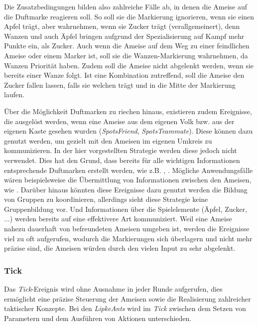 Die Zusatzbedingungen bilden also zahlreiche Fälle ab, in denen die Ameise auf die Duftmarke reagieren soll. So soll sie die Markierung ignorieren, wenn sie einen Apfel trägt, aber wahrnehmen, wenn sie Zucker trägt (verallgemeinert), denn Wanzen und auch Äpfel bringen aufgrund der Spezialisierung auf Kampf mehr Punkte ein, als Zucker. Auch wenn die Ameise auf dem Weg zu einer feindlichen Ameise oder einem Marker ist, soll sie die Wanzen-Markierung wahrnehmen, da Wanzen Priorität haben. Zudem soll die Ameise nicht abgelenkt werden, wenn sie bereits einer Wanze folgt. Ist eine Kombination zutreffend, soll die Ameise den Zucker fallen lassen, falls sie welchen trägt und in die Mitte der Markierung laufen.

Über die Möglichkeit Duftmarken zu riechen hinaus, existieren zudem Ereignisse, die ausgelöst werden, wenn eine Ameise aus dem eigenen Volk bzw. aus der eigenen Kaste gesehen wurden (\textit{SpotsFriend}, \textit{SpotsTeammate}). Diese können dazu genutzt werden, um gezielt mit den Ameisen im eigenen Umkreis zu kommunizieren. In der hier vorgestellten Strategie werden diese jedoch nicht verwendet. Dies hat den Grund, dass bereits für alle wichtigen Informationen entsprechende Duftmarken erstellt werden, wie z.B. , . Mögliche Anwendungsfälle wären beispielsweise die Übermittlung von Informationen zwischen den Ameisen, wie . Darüber hinaus könnten diese Ereignisse dazu genutzt werden die Bildung von Gruppen zu koordinieren, allerdings sieht diese Strategie keine Gruppenbildung vor. Und Informationen über die Spielelemente (Äpfel, Zucker, ...) werden bereits auf eine effektivere Art kommuniziert. Weil eine Ameise nahezu dauerhaft von befreundeten Ameisen umgeben ist, werden die Ereignisse viel zu oft aufgerufen, wodurch die Markierungen sich überlagern und nicht mehr präzise sind, die Ameisen würden durch den vielen Input zu sehr abgelenkt.

\subsubsection{Tick} \label{sssec:tick}
Das \textit{Tick}-Ereignis wird ohne Ausnahme in jeder Runde aufgerufen, dies ermöglicht eine präzise Steuerung der Ameisen sowie die Realisierung zahlreicher taktischer Konzepte. Bei den \textit{LipkeAnts} wird im \textit{Tick} zwischen dem Setzen von Parametern und dem Ausführen von Aktionen unterschieden.

